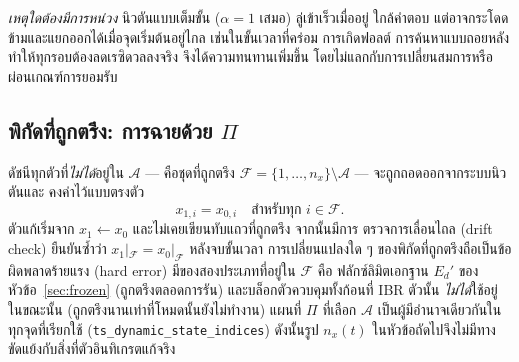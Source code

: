 \documentclass[12pt,a4paper]{article}
\begin{document}
\emph{เหตุใดต้องมีการหน่วง} นิวตันแบบเต็มขั้น ($\alpha=1$ เสมอ) ลู่เข้าเร็วเมื่ออยู่
ใกล้คำตอบ แต่อาจกระโดดข้ามและแยกออกได้เมื่อจุดเริ่มต้นอยู่ไกล เช่นในขั้นเวลาที่คร่อม
การเกิดฟอลต์ การค้นหาแบบถอยหลังทำให้ทุกรอบต้องลดเรซิดวลลงจริง จึงได้ความทนทานเพิ่มขึ้น
โดยไม่แลกกับการเปลี่ยนสมการหรือผ่อนเกณฑ์การยอมรับ

\subsection{พิกัดที่ถูกตรึง: การฉายด้วย $\Pi$}\label{sec:ts-frozen}
ดัชนีทุกตัวที่\emph{ไม่ได้}อยู่ใน $\mathcal{A}$ --- คือชุดที่ถูกตรึง
$\mathcal{F}=\{1,\dots,n_x\}\setminus\mathcal{A}$ --- จะถูกถอดออกจากระบบนิวตันและ
คงค่าไว้แบบตรงตัว
\begin{equation}
  x_{1,i}=x_{0,i}\quad\text{สำหรับทุก }i\in\mathcal{F}.
  \label{eq:frozen}
\end{equation}
ตัวแก้เริ่มจาก $x_1\!\leftarrow\!x_0$ และไม่เคยเขียนทับแถวที่ถูกตรึง จากนั้นมีการ
ตรวจการเลื่อนไถล (drift check) ยืนยันซ้ำว่า $x_{1}|_{\mathcal F}=x_{0}|_{\mathcal F}$
หลังจบขั้นเวลา การเปลี่ยนแปลงใด ๆ ของพิกัดที่ถูกตรึงถือเป็นข้อผิดพลาดร้ายแรง (hard
error) มีของสองประเภทที่อยู่ใน $\mathcal{F}$ คือ ฟลักซ์ลิมิตเอกฐาน $E_d'$ ของ
หัวข้อ~\ref{sec:frozen} (ถูกตรึงตลอดการรัน) และบล็อกตัวควบคุมทั้งก้อนที่ IBR ตัวนั้น
\emph{ไม่ได้}ใช้อยู่ในขณะนั้น (ถูกตรึงนานเท่าที่โหมดนั้นยังไม่ทำงาน) แผนที่ $\Pi$
ที่เลือก $\mathcal{A}$ เป็นผู้มีอำนาจเดียวกันในทุกจุดที่เรียกใช้
(\texttt{ts\_dynamic\_state\_indices}) ดังนั้นรูป $n_x(t)$ ในหัวข้อถัดไปจึงไม่มีทาง
ขัดแย้งกับสิ่งที่ตัวอินทิเกรตแก้จริง
\end{document}
